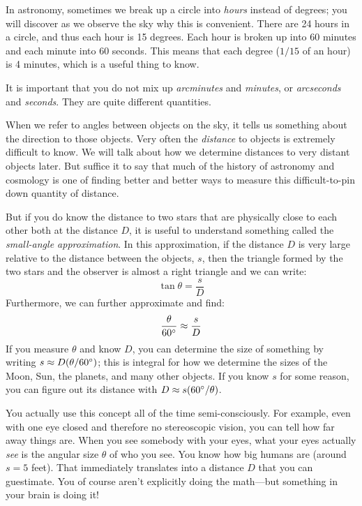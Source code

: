 \documentclass[12pt, preprint]{aastex}
\begin{document}
In astronomy, sometimes we break up a circle into {\it hours} instead
of degrees; you will discover as we observe the sky why this is
convenient. There are 24 hours in a circle, and thus each hour is 15
degrees. Each hour is broken up into 60 minutes and each minute into
60 seconds. This means that each degree ($1/15$ of an hour) is 4
minutes, which is a useful thing to know.

It is important that you do not mix up {\it arcminutes} and {\it
  minutes}, or {\it arcseconds} and {\it seconds}. They are quite
different quantities.

When we refer to angles between objects on the sky, it tells us
something about the direction to those objects. Very often the {\it
  distance} to objects is extremely difficult to know. We will talk
about how we determine distances to very distant objects later. But
suffice it to say that much of the history of astronomy and cosmology
is one of finding better and better ways to measure this
difficult-to-pin down quantity of distance.

But if you do know the distance to two stars that are physically close
to each other both at the distance $D$, it is useful to understand
something called the {\it small-angle approximation}. In this
approximation, if the distance $D$ is very large relative to the
distance between the objects, $s$, then the triangle formed by the two
stars and the observer is almost a right triangle and we can write:
\begin{equation}
\label{eq:tantheta}
\tan\theta = \frac{s}{D}
\end{equation}
Furthermore, we can further approximate and find:
\begin{equation}
\label{eq:smallangle}
\frac{\theta}{60{}^\circ} \approx \frac{s}{D}
\end{equation}
If you measure $\theta$ and know $D$, you can determine the size of
something by writing $s\approx D(\theta/60{}^\circ)$; this is integral
for how we determine the sizes of the Moon, Sun, the planets, and many
other objects. If you know $s$ for some reason, you can figure out its
distance with $D\approx s(60{}^\circ/\theta)$. 

You actually use this concept all of the time semi-consciously. For
example, even with one eye closed and therefore no stereoscopic
vision, you can tell how far away things are. When you see somebody
with your eyes, what your eyes actually {\it see} is the angular size
$\theta$ of who you see. You know how big humans are (around $s=5$
feet). That immediately translates into a distance $D$ that you can
guestimate. You of course aren't explicitly doing the math---but
something in your brain is doing it!
\end{document}
